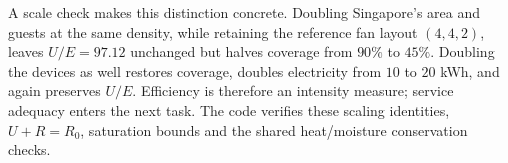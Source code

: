 A scale check makes this distinction concrete. Doubling Singapore's area and guests at the same density, while retaining the reference fan layout $(4,4,2)$, leaves $U/E=97.12$ unchanged but halves coverage from $90\%$ to $45\%$. Doubling the devices as well restores coverage, doubles electricity from $10$ to $20$ kWh, and again preserves $U/E$. Efficiency is therefore an intensity measure; service adequacy enters the next task. The code verifies these scaling identities, $U+R=R_0$, saturation bounds and the shared heat/moisture conservation checks.

